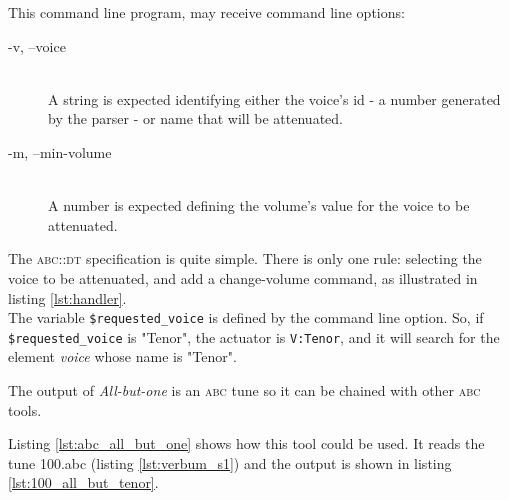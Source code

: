 \documentclass[a4paper,UKenglish]{oasics}
\newcommand{\abc}{\textsc{abc}}
\newcommand{\abcdt}{\textsc{abc::dt}}
\newcommand{\midi}{\textsc{midi} }
\newcommand{\abctomidi}{\texttt{abc2midi}}
\begin{document}

    This command line program, may receive command line options:
    \begin{description}
      \item[-v, --voice] \hfill \\
        A string is expected identifying either the voice's id - a number generated by the parser -
        or name that will be attenuated.
      \item[-m, --min-volume] \hfill \\
        A number is expected defining the volume's value for the voice to be attenuated.
    \end{description}

    The \abcdt{} specification is quite simple. There is only one rule: selecting the
    voice to be attenuated, and add a change-volume command, as illustrated in listing \ref{lst:handler}.\\

    

    The variable \texttt{\$requested\_voice} is defined by the command line option. So, if
    \texttt{\$requested\_voice} is "Tenor", the actuator is \texttt{V:Tenor}, and it will search for
    the element \emph{voice} whose name is "Tenor".

    The output of \emph{All-but-one} is an \abc{} tune so it can be chained with other \abc{} tools.

    Listing \ref{lst:abc_all_but_one} shows how this tool could be used. It reads the tune 100.abc
    (listing \ref{lst:verbum_s1}) and the output is
    shown in listing \ref{lst:100_all_but_tenor}.\\

    
\end{document}
